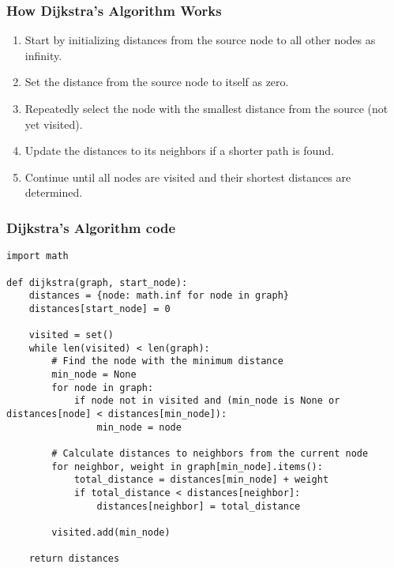 \begin{frame}[fragile]\frametitle{How Dijkstra's Algorithm Works}
\begin{enumerate}
\item Start by initializing distances from the source node to all other nodes as infinity.
\item Set the distance from the source node to itself as zero.
\item Repeatedly select the node with the smallest distance from the source (not yet visited).
\item Update the distances to its neighbors if a shorter path is found.
\item Continue until all nodes are visited and their shortest distances are determined.
\end{enumerate}
\end{frame}

\begin{frame}[fragile]\frametitle{Dijkstra's Algorithm code}
{\tiny
\begin{lstlisting}
import math

def dijkstra(graph, start_node):
    distances = {node: math.inf for node in graph}
    distances[start_node] = 0

    visited = set()
    while len(visited) < len(graph):
        # Find the node with the minimum distance
        min_node = None
        for node in graph:
            if node not in visited and (min_node is None or distances[node] < distances[min_node]):
                min_node = node

        # Calculate distances to neighbors from the current node
        for neighbor, weight in graph[min_node].items():
            total_distance = distances[min_node] + weight
            if total_distance < distances[neighbor]:
                distances[neighbor] = total_distance

        visited.add(min_node)

    return distances
\end{lstlisting}
}
\end{frame}


